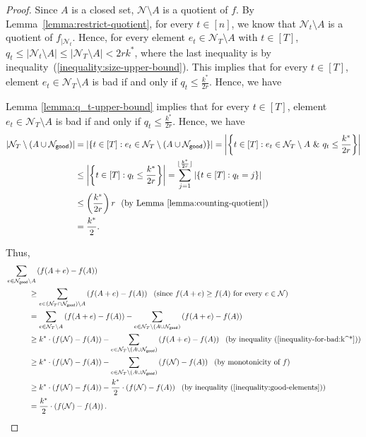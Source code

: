 \documentclass[11pt]{article}
\theoremstyle{definition}
\newcommand{\good}{\mathsf{good}}
\begin{document}
\begin{proof}
    Since $A$ is a closed set, $\mathcal{N}\setminus A$ is a quotient of $f$. By Lemma~\ref{lemma:restrict-quotient}, for every $t\in [n]$, we know that $\mathcal{N}_t\setminus A$ is a quotient of $f_{|\mathcal{N}_t}$. Hence, for every element $e_t\in \mathcal{N}_T\setminus A$ with $t\in [T]$, $q_t\leq |\mathcal{N}_t\setminus A|\leq |\mathcal{N}_T\setminus A|<2rk^*$, where the last inequality is by inequality~(\ref{inequality:size-upper-bound}). This implies that for every $t\in [T]$, element $e_t\in \mathcal{N}_T\setminus A$ is bad if and only if $q_t\leq \frac{k^*}{2r}$. Hence, we have

    \fi
    Lemma \ref{lemma:q_t-upper-bound} implies that for every $t\in [T]$, element $e_t\in \mathcal{N}_T\setminus A$ is bad if and only if $q_t\leq \frac{k^*}{2r}$. Hence, we have
    \begin{align}\label{inequality:good-elements}
        |\mathcal{N}_T \setminus (A\cup \mathcal{N}_{\good})| &= |\{t\in [T]: e_t\in \mathcal{N}_T\setminus (A\cup \mathcal{N}_{\good})\}| = \left|\left\{t\in [T] : e_t\in\mathcal{N}_T\setminus A \ \& \ q_t\leq \frac{k^*}{2r} \right\}\right| \notag \\
        &\leq \left|\left\{t\in [T] : q_t\leq \frac{k^*}{2r} \right\}\right| = \sum_{j=1}^{\lfloor \frac{k^*}{2r}\rfloor} \left|\{t\in [T] : q_t=j\}\right| \notag \\
        &\leq \left(\frac{k^*}{2r}\right) r \ \ \text{(by Lemma~\ref{lemma:counting-quotient})} \notag \\
        &= \frac{k^*}{2}.
    \end{align}
    
    Thus,
    $$\begin{aligned}
        &\sum_{e\in \mathcal{N}_{\good}\setminus A} \left(f(A+e)-f(A)\right) \\
        &\quad \quad \quad \geq \sum_{e\in (\mathcal{N}_T \cap\mathcal{N}_{\good})\setminus A} \left(f(A+e)-f(A)\right) \ \ \text{(since $f(A+e)\geq f(A)$ for every $e\in \mathcal{N}$)}\\
        &\quad \quad \quad = \sum_{e\in \mathcal{N}_T\setminus A} \left(f(A+e)-f(A)\right) - \sum_{e\in \mathcal{N}_T \setminus (A\cup \mathcal{N}_{\good})} \left(f(A+e)-f(A)\right)\\
        &\quad \quad \quad \geq k^*\cdot \left(f(\mathcal{N})-f(A)\right) - \sum_{e\in \mathcal{N}_T \setminus (A\cup \mathcal{N}_{\good})} \left(f(A+e)-f(A)\right) \ \ \text{(by inequality~(\ref{inequality-for-bad:k^*}))}\\
        &\quad \quad \quad \geq k^*\cdot \left(f(\mathcal{N})-f(A)\right) - \sum_{e\in \mathcal{N}_T \setminus (A\cup \mathcal{N}_{\good})} \left(f(\mathcal{N})-f(A)\right) \ \ \text{(by monotonicity of $f$)}\\
        &\quad \quad \quad \geq k^*\cdot \left(f(\mathcal{N})-f(A)\right) - \frac{k^*}{2}\cdot \left(f(\mathcal{N})-f(A)\right) \ \ \text{(by inequality~(\ref{inequality:good-elements}))}\\
        &\quad \quad \quad = \frac{k^*}{2}\cdot \left(f(\mathcal{N})-f(A)\right).
    \end{aligned}$$
\end{proof}
\end{document}
